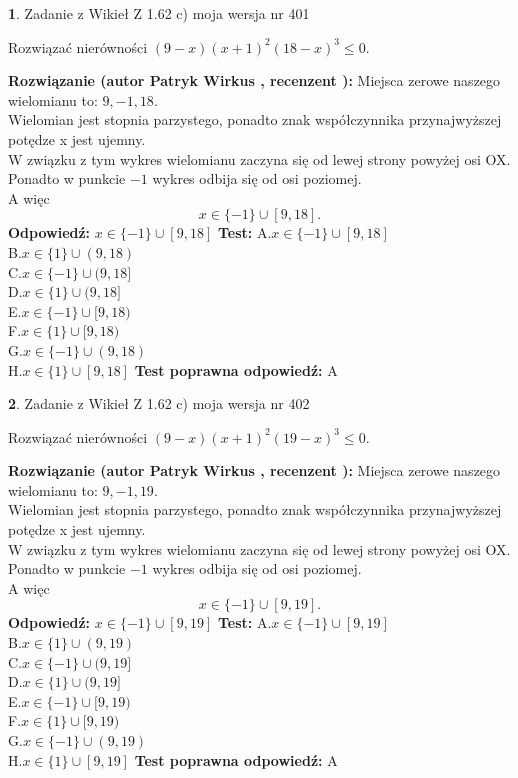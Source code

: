 \documentclass[12pt, a4paper]{article}
\theoremstyle{definition} %
\newtheorem{zad}{}
\newcommand{\zadStart}[1]{\begin{zad}#1\newline}
\newcommand{\zadStop}{\end{zad}}
\newcommand{\rozwStart}[2]{\noindent \textbf{Rozwiązanie (autor #1 , recenzent #2): }\newline}
\newcommand{\rozwStop}{\newline}
\newcommand{\odpStart}{\noindent \textbf{Odpowiedź:}\newline}
\newcommand{\odpStop}{\newline}
\newcommand{\testStart}{\noindent \textbf{Test:}\newline}
\newcommand{\testStop}{\newline}
\newcommand{\kluczStart}{\noindent \textbf{Test poprawna odpowiedź:}\newline}
\newcommand{\kluczStop}{\newline}
\begin{document}
\zadStart{Zadanie z Wikieł Z 1.62 c) moja wersja nr 401}

Rozwiązać nierówności $(9-x)(x+1)^{2}(18-x)^{3}\le0$.
\zadStop
\rozwStart{Patryk Wirkus}{}
Miejsca zerowe naszego wielomianu to: $9, -1, 18$.\\
Wielomian jest stopnia parzystego, ponadto znak współczynnika przy\linebreak najwyższej potędze x jest ujemny.\\ W związku z tym wykres wielomianu zaczyna się od lewej strony powyżej osi OX.\\
Ponadto w punkcie $-1$ wykres odbija się od osi poziomej.\\
A więc $$x \in \{-1\} \cup [9,18].$$
\rozwStop
\odpStart
$x \in \{-1\} \cup [9,18]$
\odpStop
\testStart
A.$x \in \{-1\} \cup [9,18]$\\
B.$x \in \{1\} \cup (9,18)$\\
C.$x \in \{-1\} \cup (9,18]$\\
D.$x \in \{1\} \cup (9,18]$\\
E.$x \in \{-1\} \cup [9,18)$\\
F.$x \in \{1\} \cup [9,18)$\\
G.$x \in \{-1\} \cup (9,18)$\\
H.$x \in \{1\} \cup [9,18]$
\testStop
\kluczStart
A
\kluczStop



\zadStart{Zadanie z Wikieł Z 1.62 c) moja wersja nr 402}

Rozwiązać nierówności $(9-x)(x+1)^{2}(19-x)^{3}\le0$.
\zadStop
\rozwStart{Patryk Wirkus}{}
Miejsca zerowe naszego wielomianu to: $9, -1, 19$.\\
Wielomian jest stopnia parzystego, ponadto znak współczynnika przy\linebreak najwyższej potędze x jest ujemny.\\ W związku z tym wykres wielomianu zaczyna się od lewej strony powyżej osi OX.\\
Ponadto w punkcie $-1$ wykres odbija się od osi poziomej.\\
A więc $$x \in \{-1\} \cup [9,19].$$
\rozwStop
\odpStart
$x \in \{-1\} \cup [9,19]$
\odpStop
\testStart
A.$x \in \{-1\} \cup [9,19]$\\
B.$x \in \{1\} \cup (9,19)$\\
C.$x \in \{-1\} \cup (9,19]$\\
D.$x \in \{1\} \cup (9,19]$\\
E.$x \in \{-1\} \cup [9,19)$\\
F.$x \in \{1\} \cup [9,19)$\\
G.$x \in \{-1\} \cup (9,19)$\\
H.$x \in \{1\} \cup [9,19]$
\testStop
\kluczStart
A
\kluczStop
\end{document}
